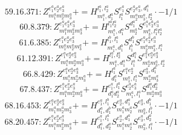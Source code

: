 \documentclass[letterpaper,10pt,fleqn,leqno,onecolumn]{article}
\begin{document}
\begin{equation} \;\;\;\;\;\;  59.16.371: Z^{e_{1}^{a}e_{2}^{a}e_{3}^{a}}_{m_{1}^{a}m_{2}^{a}m_{3}^{a}}+=H^{l_{1}^{a},l_{2}^{a}}_{m_{1}^{a},d_{1}^{a}}S^{e_{1}^{a}}_{l_{1}^{a}}S^{e_{2}^{a}e_{3}^{a},d_{1}^{a}}_{m_{2}^{a}m_{3}^{a},l_{2}^{a}}\cdot -1/1 \end{equation}
\begin{equation} \;\;\;\;\;\;  60.8.379: Z^{e_{1}^{a}e_{2}^{a}e_{3}^{a}}_{m_{1}^{a}m_{2}^{a}m_{3}^{a}}+=H^{l_{1}^{a}l_{2}^{a}}_{m_{1}^{a},d_{1}^{a}}S^{d_{1}^{a}}_{m_{2}^{a}}S^{e_{1}^{a}e_{2}^{a}e_{3}^{a}}_{m_{3}^{a},l_{1}^{a}l_{2}^{a}} \end{equation}
\begin{equation} \;\;\;\;\;\;  61.6.385: Z^{e_{1}^{a}e_{2}^{a}e_{3}^{a}}_{m_{1}^{a}m_{2}^{a}m_{3}^{a}}+=H^{l_{1}^{b},l_{1}^{a}}_{m_{1}^{a},d_{1}^{b}}S^{d_{1}^{b}}_{l_{1}^{b}}S^{e_{1}^{a}e_{2}^{a}e_{3}^{a}}_{m_{2}^{a}m_{3}^{a},l_{1}^{a}} \end{equation}
\begin{equation} \;\;\;\;\;\;  61.12.391: Z^{e_{1}^{a}e_{2}^{a}e_{3}^{a}}_{m_{1}^{a}m_{2}^{a}m_{3}^{a}}+=H^{l_{1}^{a},l_{2}^{a}}_{m_{1}^{a},d_{1}^{a}}S^{d_{1}^{a}}_{l_{1}^{a}}S^{e_{1}^{a}e_{2}^{a}e_{3}^{a}}_{m_{2}^{a}m_{3}^{a},l_{2}^{a}} \end{equation}
\begin{equation} \;\;\;\;\;\;  66.8.429: Z^{e_{1}^{a}e_{2}^{a}e_{3}^{a}}_{m_{1}^{a}m_{2}^{a}m_{3}^{a}}+=H^{l_{1}^{a}}_{d_{1}^{a}}S^{e_{1}^{a}e_{2}^{a}}_{m_{1}^{a},l_{1}^{a}}S^{e_{3}^{a},d_{1}^{a}}_{m_{2}^{a}m_{3}^{a}} \end{equation}
\begin{equation} \;\;\;\;\;\;  67.8.437: Z^{e_{1}^{a}e_{2}^{a}e_{3}^{a}}_{m_{1}^{a}m_{2}^{a}m_{3}^{a}}+=H^{e_{1}^{a},l_{1}^{a}}_{d_{1}^{a}d_{2}^{a}}S^{e_{2}^{a}e_{3}^{a}}_{m_{1}^{a},l_{1}^{a}}S^{d_{1}^{a}d_{2}^{a}}_{m_{2}^{a}m_{3}^{a}} \end{equation}
\begin{equation} \;\;\;\;\;\;  68.16.453: Z^{e_{1}^{a}e_{2}^{a}e_{3}^{a}}_{m_{1}^{a}m_{2}^{a}m_{3}^{a}}+=H^{e_{1}^{a},l_{1}^{b}}_{d_{1}^{a},d_{1}^{b}}S^{e_{2}^{a},d_{1}^{a}}_{m_{1}^{a}m_{2}^{a}}S^{e_{3}^{a},d_{1}^{b}}_{m_{3}^{a},l_{1}^{b}}\cdot -1/1 \end{equation}
\begin{equation} \;\;\;\;\;\;  68.20.457: Z^{e_{1}^{a}e_{2}^{a}e_{3}^{a}}_{m_{1}^{a}m_{2}^{a}m_{3}^{a}}+=H^{e_{1}^{a},l_{1}^{a}}_{d_{1}^{a},d_{2}^{a}}S^{e_{2}^{a},d_{1}^{a}}_{m_{1}^{a}m_{2}^{a}}S^{e_{3}^{a},d_{2}^{a}}_{m_{3}^{a},l_{1}^{a}}\cdot -1/1 \end{equation}
\end{document}
